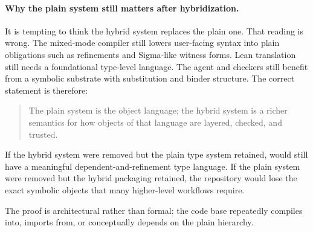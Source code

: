 \paragraph{Why the plain system still matters after hybridization.}
It is tempting to think the hybrid system replaces the plain one. That reading is wrong.
The mixed-mode compiler still lowers user-facing syntax into plain obligations such as
refinements and Sigma-like witness forms. Lean translation still needs a foundational
type-level language. The agent and checkers still benefit from a symbolic substrate with
substitution and binder structure. The correct statement is therefore:
\begin{quote}
The plain system is the object language; the hybrid system is a richer semantics for how
objects of that language are layered, checked, and trusted.
\end{quote}

\begin{proposition}
If the hybrid system were removed but the plain type system retained, \DepPy{} would still
have a meaningful dependent-and-refinement type language. If the plain system were
removed but the hybrid packaging retained, the repository would lose the exact symbolic
objects that many higher-level workflows require.
\end{proposition}

The proof is architectural rather than formal: the code base repeatedly compiles into,
imports from, or conceptually depends on the plain hierarchy.
